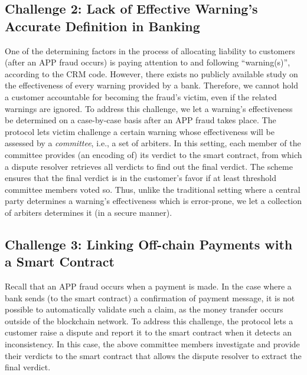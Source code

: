 \subsection{Challenge 2: Lack of Effective Warning's Accurate Definition in Banking}\label{sec::Lack-of-Effective-Warning-Definition}

One of the determining  factors in the process of allocating liability to  customers (after an APP fraud occurs) is paying attention to and following ``warning(s)'', according to the CRM code. However, there exists  no  publicly available study  on the  effectiveness of every warning  provided by  a bank. Therefore, we cannot hold a customer accountable for becoming the fraud's victim,  even if the related warnings are ignored.    To address this challenge, we let a warning's effectiveness be determined on a case-by-case basis after an APP fraud takes place. The protocol lets  victim   challenge a certain warning whose effectiveness will be assessed by a \emph{committee}, i.e., a  set of arbiters. In this setting, each member of the  committee provides (an encoding of) its verdict to the smart contract, from which a dispute resolver retrieves all verdicts to find out the final verdict. The scheme ensures that the final verdict is  in the customer's favor if at least threshold  committee members voted so. Thus, unlike the traditional setting where a central party determines a warning's effectiveness which is error-prone, we let a collection of arbiters   determines it (in a secure manner).




\subsection{Challenge 3: Linking Off-chain Payments with a Smart Contract}\label{sec::Linking Off-chain-Payments-with-contract}
 Recall that an APP fraud occurs when a payment is made. In the case where a  bank  sends  (to the smart contract) a confirmation of payment message, it is not possible to automatically validate such a claim, as the money  transfer occurs  outside of the blockchain network. To address this challenge, the protocol lets a customer raise a dispute and report it to the smart contract when it detects an inconsistency. In this case, the above committee members investigate and provide their  verdicts to the smart contract that allows the dispute resolver to extract the final verdict. 



